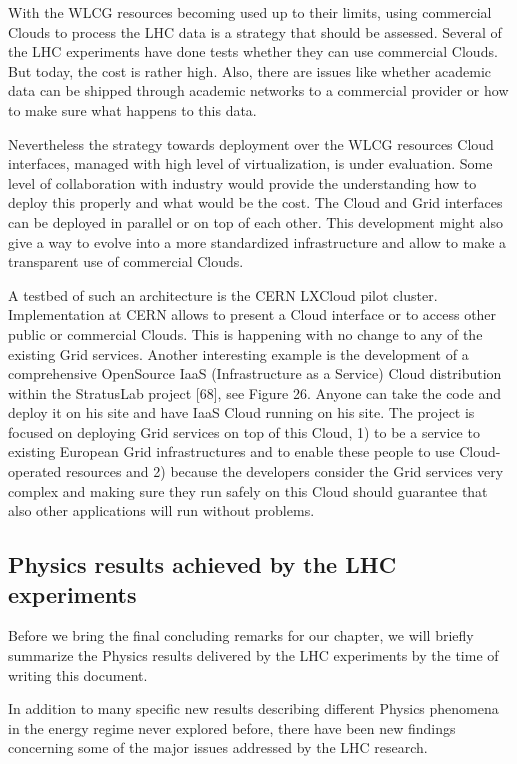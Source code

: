 With the WLCG resources becoming used up to their limits, using
commercial Clouds to process the LHC data is a strategy that should
be assessed. Several of the LHC experiments have done tests whether
they can use commercial Clouds. But today, the cost is rather high.
Also, there are issues like whether academic data can be shipped
through academic networks to a commercial provider or how to make sure
what happens to this data.

Nevertheless the strategy towards deployment over the WLCG resources
Cloud interfaces, managed with high level of virtualization, is
under evaluation. Some level of collaboration with industry would
provide the understanding how to deploy this properly and what would
be the cost. The Cloud and Grid interfaces can be deployed in
parallel or on top of each other. This development might also give a
way to evolve into a more standardized infrastructure and allow to
make a transparent use of commercial Clouds.

A testbed of such an architecture is the CERN LXCloud \cite{LXCLOUD} pilot
cluster. Implementation at CERN allows to present a Cloud interface
or to access other public or commercial Clouds. This is happening
with no change to any of the existing Grid services. Another
interesting example is the development of a comprehensive OpenSource
IaaS (Infrastructure as a Service) Cloud distribution within the
StratusLab project [68], see Figure 26. Anyone can take the code and
deploy it on his site and have IaaS Cloud running on his site. The
project is focused on deploying Grid services on top of this Cloud,
1) to be a service to existing European Grid infrastructures and to
enable these people to use Cloud-operated resources and 2) because
the developers consider the Grid services very complex and making
sure they run safely on this Cloud should guarantee that also other
applications will run without problems.


\subsection{Physics results achieved by the LHC experiments}

Before we bring the final concluding remarks for our chapter, we
will briefly summarize the Physics results delivered by the LHC
experiments by the time of writing this document.

In addition to many specific new results describing different
Physics phenomena in the energy regime never explored before, there
have been new findings concerning some of the major issues addressed
by the LHC research.

